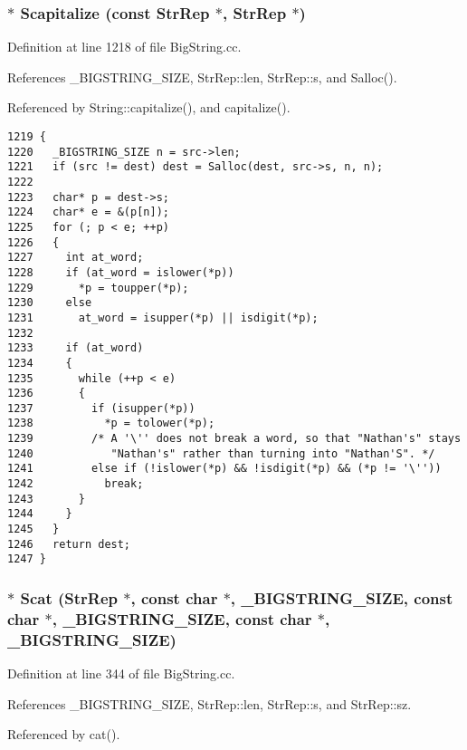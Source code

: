 \subsubsection{$\ast$ Scapitalize (const {\bf Str\-Rep} $\ast$, {\bf Str\-Rep} $\ast$)}\label{BigString_8hh_a24}




Definition at line 1218 of file Big\-String.cc.

References \_\-BIGSTRING\_\-SIZE, Str\-Rep::len, Str\-Rep::s, and Salloc().

Referenced by String::capitalize(), and capitalize().



\footnotesize\begin{verbatim}1219 {
1220   _BIGSTRING_SIZE n = src->len;
1221   if (src != dest) dest = Salloc(dest, src->s, n, n);
1222 
1223   char* p = dest->s;
1224   char* e = &(p[n]);
1225   for (; p < e; ++p)
1226   {
1227     int at_word;
1228     if (at_word = islower(*p))
1229       *p = toupper(*p);
1230     else 
1231       at_word = isupper(*p) || isdigit(*p);
1232 
1233     if (at_word)
1234     {
1235       while (++p < e)
1236       {
1237         if (isupper(*p))
1238           *p = tolower(*p);
1239         /* A '\'' does not break a word, so that "Nathan's" stays
1240            "Nathan's" rather than turning into "Nathan'S". */
1241         else if (!islower(*p) && !isdigit(*p) && (*p != '\''))
1242           break;
1243       }
1244     }
1245   }
1246   return dest;
1247 }
\end{verbatim}\normalsize 
{}
\subsubsection{$\ast$ Scat ({\bf Str\-Rep} $\ast$, const char $\ast$, {\bf \_\-BIGSTRING\_\-SIZE}, const char $\ast$, {\bf \_\-BIGSTRING\_\-SIZE}, const char $\ast$, {\bf \_\-BIGSTRING\_\-SIZE})}\label{BigString_8hh_a19}




Definition at line 344 of file Big\-String.cc.

References \_\-BIGSTRING\_\-SIZE, Str\-Rep::len, Str\-Rep::s, and Str\-Rep::sz.

Referenced by cat().



